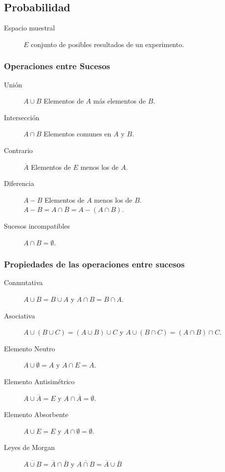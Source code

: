 \documentclass[a4paper,dvips]{article}
\newlength{\mylength}
\newenvironment{marco}{
	\setlength{\fboxsep}{5pt}
	\setlength{\mylength}{\textwidth}
	\addtolength{\mylength}{-2\fboxsep}
	\addtolength{\mylength}{-2\fboxrule}
	\noindent
	\begin{Sbox}
	\begin{minipage}{\mylength}
	\setlength{\abovedisplayskip}{3pt}
	\setlength{\belowdisplayskip}{3pt}
}
{
	\end{minipage}
	\end{Sbox}
	\fbox{\TheSbox}
}
\begin{document}
\subsection*{Probabilidad}
\begin{marco}
\begin{multicols}{2}
\begin{description}
\item [Espacio muestral] $E$ conjunto de posibles resultados de un experimento.
\end{description}
\subsubsection*{Operaciones entre Sucesos}
\begin{description}
\item [Unión] $A\cup B$ Elementos de $A$ más elementos de $B$.
\item [Intersección] $A\cap B$ Elementos comunes en $A$ y $B$.
\item [Contrario] $\overline{A}$ Elementos de $E$ menos los de $A$.
\item [Diferencia] $A-B$ Elementos de $A$ menos los de $B$.\\
$A-B =A\cap \overline{B} = A -(A\cap B)$.
\item [Sucesos incompatibles] $A\cap B=\emptyset$.
\end{description}
\subsubsection*{Propiedades de las operaciones entre sucesos}
\begin{description}
\item [Conmutativa] $A\cup B=B\cup A$ y $A\cap B=B\cap A$.
\item [Asociativa] $A\cup (B\cup C)=(A\cup B)\cup C$ y $A\cup (B\cap C)=(A\cap
B)\cap C$.
\item [Elemento Neutro] $A\cup \emptyset=A$ y $A\cap E=A$.
\item [Elemento Antisimétrico] $A\cup \overline{A}=E$ y $A\cap
\overline{A}=\emptyset$.
\item [Elemento Absorbente] $A\cup E=E$ y $A\cap \emptyset=\emptyset$.
\item [Leyes de Morgan] $\overline{A\cup B}=\overline{A}\cap\overline{B}$ y $\overline{A\cap B}=\overline{A}\cup\overline{B}$
\end{description}

\end{multicols}
\end{marco}
\end{document}
